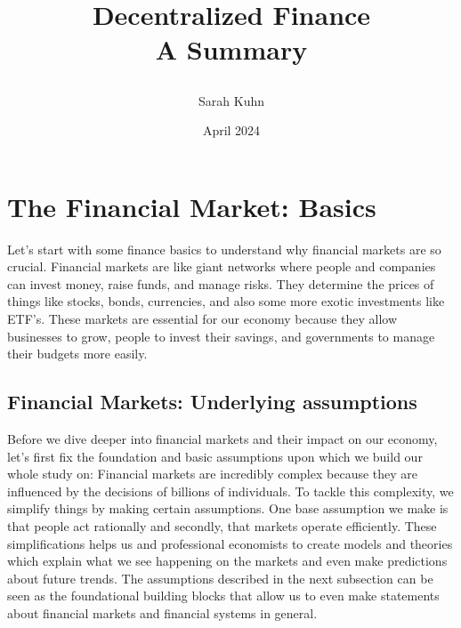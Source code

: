 \documentclass{article}
\title{Decentralized Finance \\
  \large {A Summary}
\author{Sarah Kuhn}
\date{April 2024}
}
\begin{document}
\maketitle
\thispagestyle{empty} %

\newpage
{} %
\setcounter{page}{1} %

\section{The Financial Market: Basics}
Let's start with some finance basics to understand why financial markets are so crucial. Financial markets are like giant networks where people and companies can invest money, raise funds, and manage risks. They  determine the prices of things like stocks, bonds, currencies, and also some more exotic investments like ETF's. These markets are essential for our economy because they allow  businesses to grow, people to invest their savings, and governments to manage their budgets more easily.

\subsection{Financial Markets: Underlying assumptions} 

Before we dive deeper into financial markets and their impact on our economy, let's first fix the foundation and basic assumptions upon which we build our whole study on:  Financial markets are incredibly complex because they are influenced by the decisions of billions of individuals. To tackle this complexity, we simplify things by making certain assumptions. One base assumption we make is that people act rationally and secondly, that markets operate efficiently. These simplifications helps us and professional economists to create models and theories which explain what we see happening on the markets and even make predictions about future trends. The assumptions described in the next subsection can be seen as the foundational building blocks that allow us to even make statements about financial markets and financial systems in general.
\end{document}
